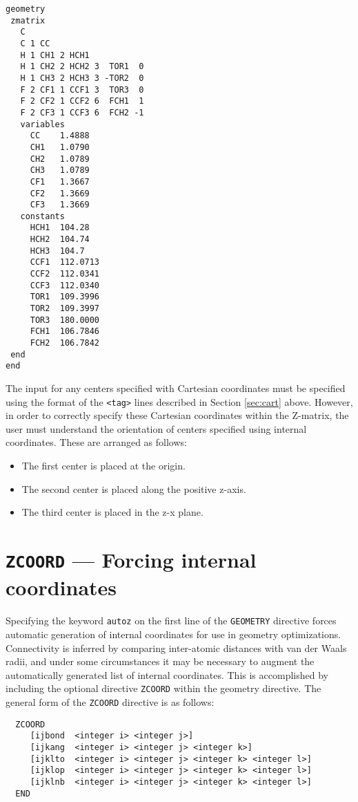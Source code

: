 \begin{verbatim}
geometry 
 zmatrix
   C 
   C 1 CC 
   H 1 CH1 2 HCH1 
   H 1 CH2 2 HCH2 3  TOR1  0 
   H 1 CH3 2 HCH3 3 -TOR2  0 
   F 2 CF1 1 CCF1 3  TOR3  0 
   F 2 CF2 1 CCF2 6  FCH1  1 
   F 2 CF3 1 CCF3 6  FCH2 -1
   variables
     CC    1.4888 
     CH1   1.0790 
     CH2   1.0789  
     CH3   1.0789  
     CF1   1.3667 
     CF2   1.3669 
     CF3   1.3669
   constants
     HCH1  104.28 
     HCH2  104.74 
     HCH3  104.7 
     CCF1  112.0713 
     CCF2  112.0341 
     CCF3  112.0340 
     TOR1  109.3996 
     TOR2  109.3997 
     TOR3  180.0000 
     FCH1  106.7846 
     FCH2  106.7842
 end   
end
\end{verbatim}

The input for any centers specified with Cartesian coordinates must
be specified using the format of the \verb+<tag>+ lines described
in Section \ref{sec:cart} above.  However, in
order to correctly specify these Cartesian coordinates 
within the Z-matrix, the user must
understand the orientation of centers specified using
internal coordinates.  These are arranged as follows:
\begin{itemize}
\item The first center is placed at the origin.
\item The second center is placed along the positive z-axis.
\item The third center is placed in the z-x plane.
\end{itemize}

\section{{\tt ZCOORD} --- Forcing internal coordinates}
\label{sec:zcoord}

Specifying the keyword \verb+autoz+ on the first line of the
\verb+GEOMETRY+ directive forces automatic generation of internal
coordinates for use in geometry optimizations.  Connectivity is
inferred by comparing inter-atomic distances with van der Waals radii,
and under some circumstances it may be necessary to augment the
automatically generated list of internal coordinates.  This is
accomplished by including the optional directive {\tt ZCOORD} within
the geometry directive.  The general form of the \verb+ZCOORD+
directive is as follows:
\begin{verbatim}
  ZCOORD
     [ijbond  <integer i> <integer j>]
     [ijkang  <integer i> <integer j> <integer k>]
     [ijklto  <integer i> <integer j> <integer k> <integer l>]
     [ijklop  <integer i> <integer j> <integer k> <integer l>]
     [ijklnb  <integer i> <integer j> <integer k> <integer l>]
  END
\end{verbatim}

